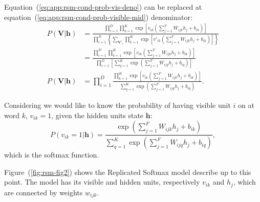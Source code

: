 Equation~(\ref{eq:app:rsm-cond-prob-vis-deno}) can be replaced at equation~(\ref{eq:app:rsm-cond-prob-visible-mid}) denominator:
\begin{align}
    P(\mathbf{V} | \mathbf{h}) &= \frac{\prod\limits^{D}_{i=1} \prod\limits^{K}_{k=1} \exp{\left[ v_{ik} \left( \sum\limits^{F}_{j=1} W_{ijk} h_{j} + b_{ik}\right)\right]}}{\prod\limits^{D}_{i=1} \left\{\sum\limits_{\mathbf{V}'_{i}} \prod\limits^{K}_{k=1} \exp{\left[ v'_{ik} \left( \sum\limits^{F}_{j=1} W_{ijk} h_{j} + b_{ik}\right)\right]}\right\}} \nonumber \\ %
    &= \frac{\prod\limits^{D}_{i=1} \prod\limits^{K}_{k=1} \exp{\left[ v_{ik} \left( \sum\limits^{F}_{j=1} W_{ijk} h_{j} + b_{ik}\right)\right]}}{\prod\limits^{D}_{i=1} \left[ \sum\limits^{K}_{q=1} \exp{\left( \sum\limits^{F}_{j=1} W_{ijq} h_{j} + b_{iq}\right)} \right]} \nonumber \\ %
    P(\mathbf{V} | \mathbf{h}) &= \prod\limits^{D}_{i=1} \frac{\prod\limits^{K}_{k=1} \exp{\left[ v_{ik} \left( \sum\limits^{F}_{j=1} W_{ijk} h_{j} + b_{ik}\right)\right]}}{\sum\limits^{K}_{q=1} \exp{\left( \sum\limits^{F}_{j=1} W_{ijq} h_{j} + b_{iq}\right)}}.
\end{align}

Considering we would like to know the probability of having visible unit $i$ on at word $k$, $v_{ik} = 1$, given the hidden units state $\mathbf{h}$:
\begin{equation}
    \label{eq:app:rsm-visible-softmax}
    P(v_{ik} = 1 | \mathbf{h}) = \frac{\exp{\left( \sum\limits^{F}_{j=1} W_{ijk} h_{j} + b_{ik}\right)}}{\sum\limits^{K}_{q=1} \exp{\left( \sum\limits^{F}_{j=1} W_{ijq} h_{j} + b_{iq}\right)}},
\end{equation}
which is the softmax function.

Figure~(\ref{fig:rsm-fig2}) shows the Replicated Softmax model describe up to this point. The model has its visible and hidden units, respectively $v_{ik}$ and $h_{j}$, which are connected by weights $w_{ijk}$. 




